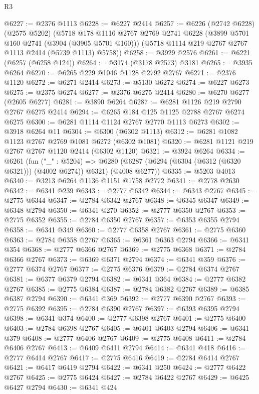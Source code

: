 \begin{lexlean}{R3}
\begin{coremodule}
@6227 := @2376 @1113
@6228 := @6227 @2414
@6257 := @6226
    (@2742 @6228)
    (@2575 @5202)
    (@5718
      @178
      @1116
      @2767
      @2769
      @2741
      @6228
      (@3899 @5701 @160 @2741 (@3904 (@3905 @5701 @160)))
      (@5718 @1114 @219 @2767 @2767 @1113 @2414 (@5739 @1113) @5758))
@6258 := @3929 @2576
@6261 := @6221 (@6257 (@6258 @124))
@6264 := @3174 (@3178 @2573) @3181
@6265 := @3935 @6264
@6270 := @6265 @229 @1046 @1128 @2792 @2767
@6271 := @2376 @1120
@6272 := @6271 @2414
@6273 := @5130 @6272
@6274 := @6227 @6273
@6275 := @2375 @6274
@6277 := @2376 @6275 @2414
@6280 := @6270 @6277 (@2605 @6277)
@6281 := @3890 @6264
@6287 := @6281 @1126 @219 @2790 @2767 @6275 @2414
@6294 := @6265 @184 @125 @1125 @2788 @2767 @6274 @6275
@6300 := @6281 @1114 @1124 @2767 @2770 @1113 @6273
@6302 := @3918 @6264 @11
@6304 := @6300 (@6302 @1113)
@6312 := @6281 @1082 @1123 @2767 @2769 @1081 @6272 (@6302 @1081)
@6320 := @6281 @1121 @219 @2767 @2767 @1120 @2414 (@6302 @1120)
@6321 := @3924 @6264
@6334 := @6261
    (fun ("_" : @5204) =>
    @6280 (@6287 (@6294 (@6304 (@6312 (@6320 @6321))) (@4002 @6274)) @6321) (@4008 @6277))
@6335 := @5203 @4013
@6340 := @3213 @6264 @1136 @1151 @1758 @2772
@6341 := @2778 @2630
@6342 := @6341 @239
@6343 := @2777 @6342
@6344 := @6343 @2767
@6345 := @2775 @6344
@6347 := @2784 @6342 @2767
@6348 := @6345 @6347
@6349 := @6348 @2794
@6350 := @6341 @270
@6352 := @2777 @6350 @2767
@6353 := @2775 @6352
@6355 := @2784 @6350 @2767
@6357 := @6353 @6355 @2794
@6358 := @6341 @349
@6360 := @2777 @6358 @2767
@6361 := @2775 @6360
@6363 := @2784 @6358 @2767
@6365 := @6361 @6363 @2794
@6366 := @6341 @354
@6368 := @2777 @6366 @2767
@6369 := @2775 @6368
@6371 := @2784 @6366 @2767
@6373 := @6369 @6371 @2794
@6374 := @6341 @359
@6376 := @2777 @6374 @2767
@6377 := @2775 @6376
@6379 := @2784 @6374 @2767
@6381 := @6377 @6379 @2794
@6382 := @6341 @364
@6384 := @2777 @6382 @2767
@6385 := @2775 @6384
@6387 := @2784 @6382 @2767
@6389 := @6385 @6387 @2794
@6390 := @6341 @369
@6392 := @2777 @6390 @2767
@6393 := @2775 @6392
@6395 := @2784 @6390 @2767
@6397 := @6393 @6395 @2794
@6398 := @6341 @374
@6400 := @2777 @6398 @2767
@6401 := @2775 @6400
@6403 := @2784 @6398 @2767
@6405 := @6401 @6403 @2794
@6406 := @6341 @379
@6408 := @2777 @6406 @2767
@6409 := @2775 @6408
@6411 := @2784 @6406 @2767
@6413 := @6409 @6411 @2794
@6414 := @6341 @418
@6416 := @2777 @6414 @2767
@6417 := @2775 @6416
@6419 := @2784 @6414 @2767
@6421 := @6417 @6419 @2794
@6422 := @6341 @250
@6424 := @2777 @6422 @2767
@6425 := @2775 @6424
@6427 := @2784 @6422 @2767
@6429 := @6425 @6427 @2794
@6430 := @6341 @424

\end{coremodule}
\end{lexlean}
